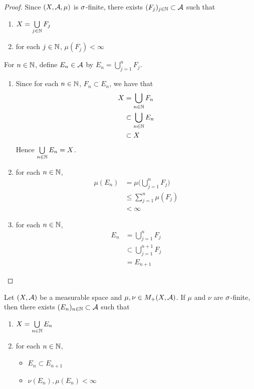 \documentclass{book}
\begin{document}
	\begin{proof}
		Since $(X, \mathcal{A}, \mu)$ is $\sigma$-finite, there exists $(F_j)_{j \in \mathbb{N}} \subset \mathcal{A}$ such that 
		\begin{enumerate}
			\item $X = \bigcup\limits_{j \in \mathbb{N}} F_j$
			\item for each $j \in \mathbb{N}$, $\mu(F_j) < \infty$ 
		\end{enumerate}
		For $n \in \mathbb{N}$, define $E_n \in \mathcal{A}$ by $E_n = \bigcup\limits_{j=1}^n F_j$. 
		\begin{enumerate}
			\item Since for each $n \in \mathbb{N}$, $F_n \subset E_n$, we have that 
			\begin{align*}
				X
				& = \bigcup\limits_{n \in \mathbb{N}} F_n \\
				& \subset \bigcup\limits_{n \in \mathbb{N}} E_n \\
				& \subset X
			\end{align*}
			Hence $\bigcup\limits_{n \in \mathbb{N}} E_n = X$.
			\item for each $n \in \mathbb{N}$, 
			\begin{align*}
				\mu(E_n)
				& = \mu \bigg( \bigcup_{j=1}^n F_j\bigg) \\
				& \leq \sum_{j=1}^n \mu(F_j) \\
				& < \infty 
			\end{align*}
			\item for each $n \in \mathbb{N}$, 
			\begin{align*}
				E_n
				& = \bigcup_{j=1}^n F_j \\
				& \subset \bigcup_{j=1}^{n+1} F_j \\
				& = E_{n+1}
			\end{align*}
		\end{enumerate}
	\end{proof}
	
	\begin{ex} 
		Let $(X, \mathcal{A})$ be a measurable space and $\mu, \nu \in M_+(X, \mathcal{A})$. If $\mu$ and $\nu$ are $\sigma$-finite, then there exists $(E_n)_{n \in \mathbb{N}} \subset \mathcal{A}$ such that 
		\begin{enumerate}
			\item $X = \bigcup\limits_{n \in \mathbb{N}} E_n$
			\item for each $n \in \mathbb{N}$,
			\begin{itemize}
				\item $E_n \subset E_{n+1}$
				\item $\nu(E_n), \mu(E_n) < \infty$
			\end{itemize}
		\end{enumerate} 
	\end{ex}
	
\end{document}
